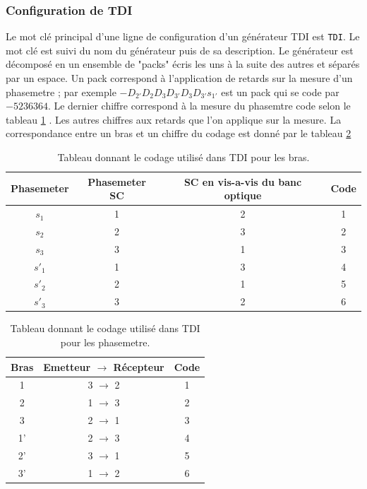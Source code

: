 \documentclass[a4paper,english,12pt]{article}
\begin{document}
\subsubsection{Configuration de TDI}
\label{SSSConfigTDI}
Le mot cl\'e principal d'une ligne de configuration d'un g\'en\'erateur TDI est \texttt{TDI}. Le mot cl\'e est suivi du nom du g\'en\'erateur puis de sa description. Le g\'en\'erateur est d\'ecompos\'e en un ensemble de "packs" \'ecris les uns \`a la suite des autres et s\'epar\'es par un espace. Un pack correspond \`a l'application de retards sur la mesure d'un phasemetre ; par exemple $-D_{2'} D_{2} D_{3} D_{3'} D_{3} D_{3'}  s_{1'}$ est un pack qui se code par $-5236364$.  Le dernier chiffre correspond \`a la mesure du phasemtre code selon le tableau \ref{TDICodePha} . Les autres chiffres aux retards que l'on applique sur la mesure. La correspondance entre un bras et un chiffre du codage est donn\'e par le tableau \ref{TDICodeDelay} \\
\begin{table}[htdp]
\begin{center}
\begin{tabular}{|c|c|c|c|}
\hline
Phasemeter & Phasemeter SC &  SC en vis-a-vis du banc optique  & Code \\
\hline
$s_{1}$ & 1 & 2 & 1\\
\hline
$s_{2}$ & 2 & 3 & 2\\
\hline
$s_{3}$ & 3 & 1 & 3\\
\hline
$s'_{1}$ & 1 & 3 & 4\\
\hline
$s'_{2}$ & 2 & 1 & 5\\
\hline
$s'_{3}$ & 3 & 2 & 6\\
\hline
\end{tabular}
\end{center}
\caption{Tableau donnant le codage utilis\'e dans TDI pour les bras.}
\label{TDICodePha}
\end{table} 

\begin{table}[htdp]
\begin{center}
\begin{tabular}{|c|c|c|}
\hline
Bras & Emetteur $\rightarrow$ R\'ecepteur & Code \\
\hline
1 & 3 $\rightarrow$ 2 & 1\\
\hline
2 & 1 $\rightarrow$ 3 & 2\\
\hline 
3 & 2 $\rightarrow$ 1 & 3\\
\hline 
1' & 2 $\rightarrow$ 3 & 4\\
\hline 
2' & 3 $\rightarrow$ 1 & 5\\
\hline 
3' & 1 $\rightarrow$ 2 & 6\\
\hline 
\end{tabular}
\end{center}
\caption{Tableau donnant le codage utilis\'e dans TDI pour les phasemetre.}
\label{TDICodeDelay}
\end{table} 
\end{document}
